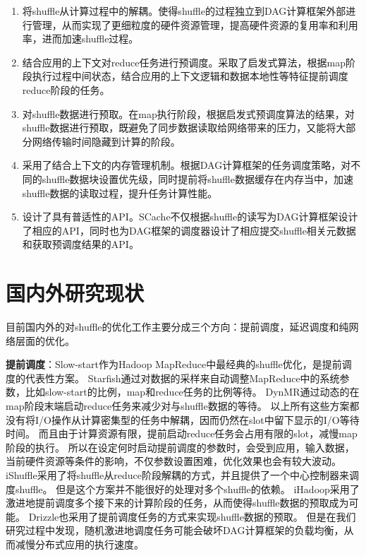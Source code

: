 \begin{enumerate}
	\item 将shuffle从计算过程中的解耦。使得shuffle的过程独立到DAG计算框架外部进行管理，从而实现了更细粒度的硬件资源管理，提高硬件资源的复用率和利用率，进而加速shuffle过程。
	\item 结合应用的上下文对reduce任务进行预调度。采取了启发式算法，根据map阶段执行过程中间状态，结合应用的上下文逻辑和数据本地性等特征提前调度reduce阶段的任务。
	\item 对shuffle数据进行预取。在map执行阶段，根据启发式预调度算法的结果，对shuffle数据进行预取，既避免了同步数据读取给网络带来的压力，又能将大部分网络传输时间隐藏到计算的阶段。
	\item 采用了结合上下文的内存管理机制。根据DAG计算框架的任务调度策略，对不同的shuffle数据块设置优先级，同时提前将shuffle数据缓存在内存当中，加速shuffle数据的读取过程，提升任务计算性能。
	\item 设计了具有普适性的API。SCache不仅根据shuffle的读写为DAG计算框架设计了相应的API，同时也为DAG框架的调度器设计了相应提交shuffle相关元数据和获取预调度结果的API。
\end{enumerate}

\section{国内外研究现状}
\label{sec:relatedwork}

目前国内外的对shuffle的优化工作主要分成三个方向：提前调度，延迟调度和纯网络层面的优化。

\textbf{提前调度}：Slow-start作为Hadoop MapReduce\cite{hadoop}中最经典的shuffle优化，是提前调度的代表性方案。
Starfish\cite{starfish}通过对数据的采样来自动调整MapReduce中的系统参数，比如slow-start的比例，map和reduce任务的比例等待。
DynMR\cite{dynmr}通过动态的在map阶段末端启动reduce任务来减少对与shuffle数据的等待。
以上所有这些方案都没有将I/O操作从计算密集型的任务中解耦，因而仍然在slot中留下显示的I/O等待时间。
而且由于计算资源有限，提前启动reduce任务会占用有限的slot，减慢map阶段的执行。
所以在设定何时启动提前调度的参数时，会受到应用，输入数据，当前硬件资源等条件的影响，不仅参数设置困难，优化效果也会有较大波动。
iShuffle\cite{ishuffle}采用了将shuffle从reduce阶段解耦的方式，并且提供了一个中心控制器来调度shuffle。
但是这个方案并不能很好的处理对多个shuffle的依赖。
iHadoop\cite{ihadoop}采用了激进地提前调度多个接下来的计算阶段的任务，从而使得shuffle数据的预取成为可能。
Drizzle\cite{drizzle}也采用了提前调度任务的方式来实现shuffle数据的预取。
但是在我们研究过程中发现，随机激进地调度任务可能会破坏DAG计算框架的负载均衡，从而减慢分布式应用的执行速度。

